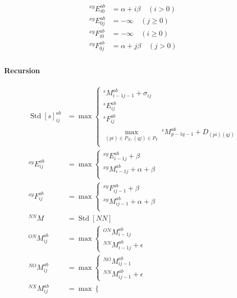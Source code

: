 \documentclass{article}
\newcommand{\N}[1]{\operatorname{Std}[#1]}
\begin{document}
\begin{align*}
  ^{xy}E^{ab}_{i0} &= \alpha+i\beta\quad (i>0)\\
  ^{xy}E^{ab}_{0j} &= -\infty\quad (j\geq 0)\\
  ^{xy}F^{ab}_{i0} &= -\infty\quad (i\geq 0)\\
  ^{xy}F^{ab}_{0j} &= \alpha+j\beta\quad (j>0)\\
\end{align*}


\paragraph{Recursion}
\begin{align*}
  \N{s}^{ab}_{ij} &= 
  \max
  \begin{cases}
    ^sM^{ab}_{i-1j-1} + \sigma_{ij}\\
    ^sE^{ab}_{ij}\\
    ^sF^{ab}_{ij}\\
    \max_{(pi)\in P_X,(qj)\in P_Y}\ ^sM^{ab}_{p-1q-1} + D_{(pi)(qj)}\\
  \end{cases}\\
  ^{xy}E^{ab}_{ij} &= \max
  \begin{cases}
    ^{xy}E^{ab}_{i-1j}+\beta\\
    ^{xy}M^{ab}_{i-1j}+\alpha+\beta\\
  \end{cases}\\
  ^{xy}F^{ab}_{ij} &= \max
  \begin{cases}
    ^{xy}F^{ab}_{ij-1}+\beta\\
    ^{xy}M^{ab}_{ij-1}+\alpha+\beta\\
  \end{cases}\\
  ^{NN}M &= \N{NN}\\
  ^{ON}M^{ab}_{ij} &= \max
  \begin{cases}
    ^{ON}M^{ab}_{i-1j}\\
    ^{NN}M^{ab}_{i-1j} + \epsilon
  \end{cases}\\
  ^{NO}M^{ab}_{ij} &= \max 
  \begin{cases}
    ^{NO}M^{ab}_{ij-1}\\
    ^{NN}M^{ab}_{ij-1} + \epsilon
  \end{cases}\\
  ^{NX}M^{ab}_{ij} &= \max 
  \begin{cases}

\end{cases}
\end{align*}
\end{document}
